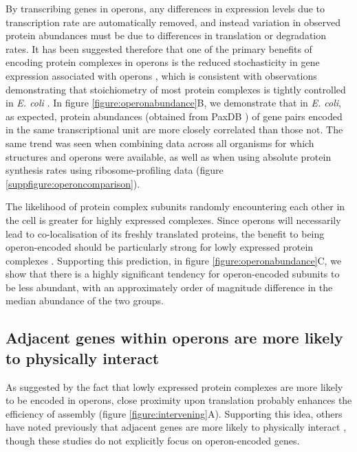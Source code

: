 \documentclass[a4paper,11pt,twoside,openright]{scrbook}
\begin{document}
By transcribing genes in operons, any differences in expression levels due to transcription rate are automatically removed, and instead variation in observed protein abundances must be due to differences in translation or degradation rates. It has been suggested therefore that one of the primary benefits of encoding protein complexes in operons is the reduced stochasticity in gene expression associated with operons \cite{Swain2004,Sneppen2010,Shieh2015a}, which is consistent with observations demonstrating that stoichiometry of most protein complexes is tightly controlled in \textit{E. coli} \cite{Li2014b}. In figure \ref{figure:operonabundance}B, we demonstrate that in \textit{E. coli}, as expected, protein abundances (obtained from PaxDB \cite{Wang2015}) of gene pairs encoded in the same transcriptional unit are more closely correlated than those not. The same trend was seen when combining data across all organisms for which structures and operons were available, as well as when using absolute protein synthesis rates using ribosome-profiling data \cite{Li2014b} (figure \ref{suppfigure:operoncomparison}).

The likelihood of protein complex subunits randomly encountering each other in the cell is greater for highly expressed complexes. Since operons will necessarily lead to co-localisation of its freshly translated proteins, the benefit to being operon-encoded should be particularly strong for lowly expressed protein complexes \cite{Swain2002,Kovacs2009}. Supporting this prediction, in figure \ref{figure:operonabundance}C, we show that there is a highly significant tendency for operon-encoded subunits to be less abundant, with an approximately order of magnitude difference in the median abundance of the two groups.

\subsection{Adjacent genes within operons are more likely to physically interact}
As suggested by the fact that lowly expressed protein complexes are more likely to be encoded in operons, close proximity upon translation probably enhances the efficiency of assembly (figure \ref{figure:intervening}A). Supporting this idea, others have noted previously that adjacent genes are more likely to physically interact \cite{Mushegian1996,Dandekar1998}, though these studies do not explicitly focus on operon-encoded genes.
\end{document}
